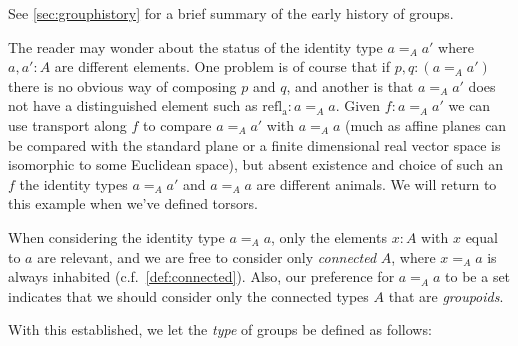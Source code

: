 See \cref{sec:grouphistory} for a brief summary of the early history of groups.
\begin{remark}
  The reader may wonder about the status of the identity type $a=_Aa'$ where $a,a':A$ are different elements.  One problem is of course that if $p,q:(a=_Aa')$ there is no obvious way of composing $p$ and $q$, and another is that $a=_Aa'$ does not have a distinguished element such as $\mathrm{refl{}_a}:a=_Aa$.
Given $f:a=_Aa'$ we can use transport along $f$ to compare $a=_Aa'$ with $a=_Aa$ (much as affine planes can be compared with the standard plane or a finite dimensional real vector space is isomorphic to some Euclidean space), but absent existence and choice of such an $f$ the identity types $a=_Aa'$ and $a=_Aa$ are different animals.  We will return to this example when we've defined torsors.
\end{remark}


\begin{remark}
  When considering the identity type $a=_Aa$, only the elements $x:A$ with $x$ equal to $a$ are relevant, and we are free to consider only \emph{connected} $A$, \ie where $x=_Aa$ is always inhabited (c.f.~\cref{def:connected}).  Also, our preference for $a=_Aa$ to be a set indicates that we should consider only the connected types $A$ that are \emph{groupoids}.
\end{remark}


With this established, we let the \emph{type} of groups be defined as follows:

